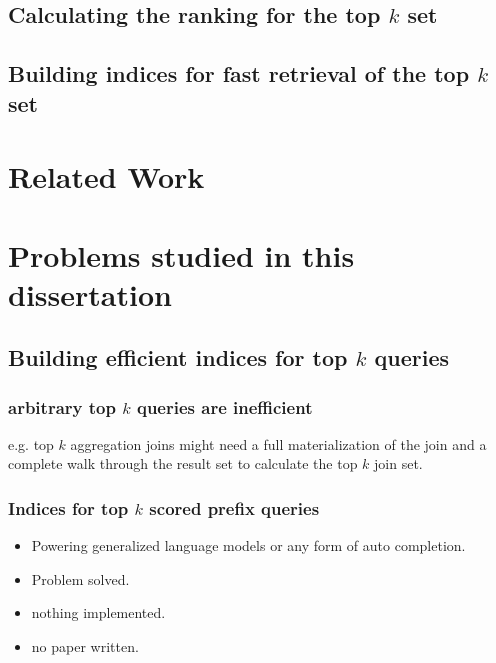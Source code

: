 \documentclass[•]{article}
\begin{document}
\subsection{Calculating the ranking for the top $k$ set}
\subsection{Building indices for fast retrieval of the top $k$ set}

\section{Related Work}

\pagebreak
\section{Problems studied in this dissertation}

\subsection{Building efficient indices for top $k$ queries}
\subsubsection{arbitrary top $k$ queries are inefficient}
e.g. top $k$ aggregation joins might need a full materialization of the join and a complete walk through the result set to calculate the top $k$ join set.
\subsubsection{Indices for top $k$ scored prefix queries}
\begin{itemize}
\item Powering generalized language models or any form of auto completion. 
\item Problem solved. 
\item nothing implemented.
\item no paper written.
\end{itemize}
\end{document}
